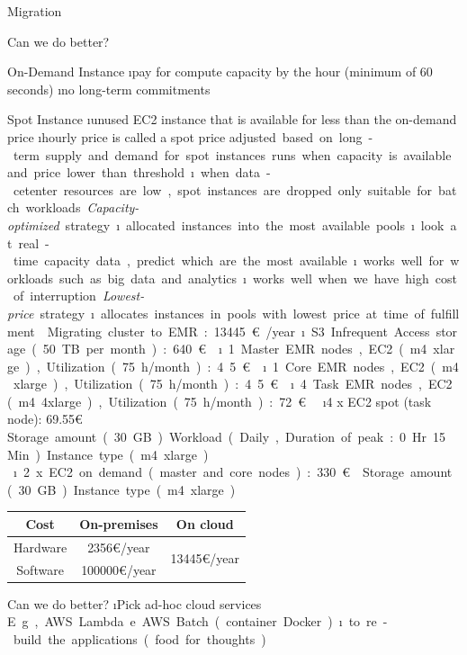 \begin{frame}{Migration}
\framebreak

Can we do better?

On-Demand Instance
\i pay for compute capacity by the hour (minimum of 60 seconds)
\i no long-term commitments

Spot Instance 
\i unused EC2 instance that is available for less than the on-demand price
\i hourly price is called a spot price
\si adjusted based on long-term supply and demand for spot instances
\si runs when capacity is available and price lower than threshold
\i when data-cetenter resources are low, spot instances are dropped
\si only suitable for batch workloads

\textit{Capacity-optimized} strategy
\i allocated instances into the most available pools
\i look at real-time capacity data, predict which are the most available
\i works well for workloads such as big data and analytics
\i works well when we have high cost of interruption 

\textit{Lowest-price} strategy
\i allocates instances in pools with lowest price at time of fulfillment


\framebreak

Migrating cluster to EMR: 13445\euro{}/year
\i S3 Infrequent Access storage (50 TB per month): 640\euro{}
\i 1 Master EMR nodes, EC2 (m4.xlarge), Utilization (75 h/month): 4.5\euro{}
\i 1 Core EMR nodes, EC2 (m4.xlarge), Utilization (75 h/month): 4.5\euro{}
\i 4 Task EMR nodes, EC2 (m4.4xlarge), Utilization (75 h/month): 72\euro{}
\r{
\i 4 x EC2 spot (task node): 69.55\euro{}
\si Storage amount (30 GB)
\si Workload (Daily, Duration of peak: 0 Hr 15 Min)
\si Instance type (m4.xlarge)
}
\i 2 x EC2 on demand (master and core nodes): 330\euro{}
\si Storage amount (30 GB)
\si Instance type (m4.xlarge)

\framebreak

\begin{table}[h!]
    \centering
    \footnotesize
    \begin{tabular}{ccc}
        Cost     &  On-premises       & On cloud                           \\\hline
        Hardware &  2356\euro{}/year  & \multirow{2}{*}{13445\euro{}/year} \\
        Software & 100000\euro{}/year &                                    \\
    \end{tabular}
\end{table}

Can we do better?
\i Pick ad-hoc cloud services
\si E.g., AWS Lambda e AWS Batch (container Docker)
\i ... to re-build the applications (food for thoughts)

\end{frame}



